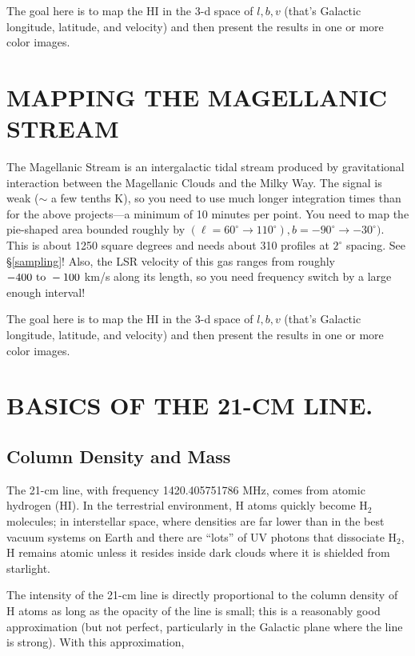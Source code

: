\documentclass[psfig,preprint]{aastex}
\begin{document}
The goal here is to map the HI in the 3-d space of ${l, b, v}$ (that's
Galactic longitude, latitude, and velocity) and then present the results
in one or more color images.

\section{MAPPING THE MAGELLANIC STREAM}

The Magellanic Stream is an intergalactic tidal stream produced by
gravitational interaction between the Magellanic Clouds and the Milky
Way. The signal is weak ($\sim$ a few tenths K), so you need to use much
longer integration times than for the above projects---a minimum of 10
minutes per point. You need to map the pie-shaped area bounded roughly
by $(\ell=60^\circ \rightarrow 110^\circ), b=-90^\circ \rightarrow
-30^\circ)$. This is about 1250 square degrees and needs about 310
profiles at $2^\circ$ spacing. See \S \ref{sampling}!  Also, the LSR
velocity of this gas ranges from roughly $-400 \ {\rm to} \ -100$ km/s
along its length, so you need frequency switch by a large enough
interval!

The goal here is to map the HI in the 3-d space of ${l, b, v}$ (that's
Galactic longitude, latitude, and velocity) and then present the results
in one or more color images.

\section{BASICS OF THE 21-CM LINE.} \label{basics}

\subsection{Column Density and Mass} \label{coldensity}

	The 21-cm line, with frequency 1420.405751786 MHz, comes from
atomic hydrogen (HI).  In the terrestrial environment, H atoms quickly
become H$_2$ molecules; in interstellar space, where densities are far
lower than in the best vacuum systems on Earth and there are ``lots'' of
UV photons that dissociate H$_2$, H remains atomic unless it resides
inside dark clouds where it is shielded from starlight.

	The intensity of the 21-cm line is directly proportional to the
column density of H atoms as long as the opacity of the line is small;
this is a reasonably good approximation (but not perfect, particularly
in the Galactic plane where the line is strong). With this
approximation, 
\end{document}
